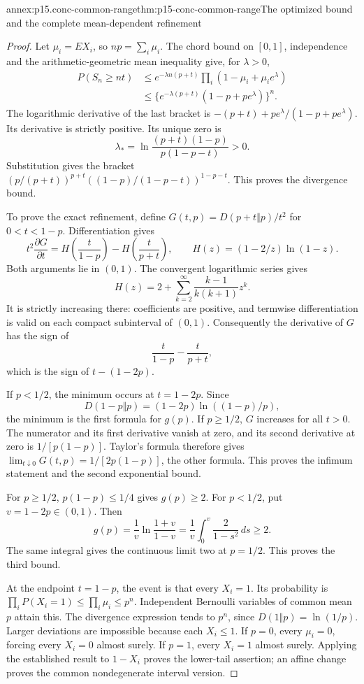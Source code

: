 \begin{annexitem}{annex:p15.conc-common-range}{thm:p15-conc-common-range}{The optimized bound and the complete mean-dependent refinement}
\begin{proof}
Let \(\mu_i=EX_i\), so \(np=\sum_i\mu_i\).
The chord bound on \([0,1]\), independence and the
arithmetic-geometric mean inequality give, for \(\lambda>0\),
\[
 \begin{split}
 P(S_n\geq nt)
 &\leq e^{-\lambda n(p+t)}
                      \prod_i(1-\mu_i+\mu_i e^\lambda)\\
 &\leq \{e^{-\lambda(p+t)}(1-p+pe^\lambda)\}^n.
 \end{split}
\]
The logarithmic derivative of the last bracket is
\(-(p+t)+pe^\lambda/(1-p+pe^\lambda)\).
Its derivative is strictly positive. Its unique zero is
\[
 \lambda_*=
       \ln\frac{(p+t)(1-p)}{p(1-p-t)}>0.
\]
Substitution gives the bracket
\((p/(p+t))^{p+t}((1-p)/(1-p-t))^{1-p-t}\).
This proves the divergence bound.

To prove the exact refinement, define
\(G(t,p)=D(p+t\Vert p)/t^2\) for \(0<t<1-p\).
Differentiation gives
\[
 t^2\frac{\partial G}{\partial t}
      =H\!\left(\frac{t}{1-p}\right)
           -H\!\left(\frac{t}{p+t}\right),
 \qquad H(z)=(1-2/z)\ln(1-z).
\]
Both arguments lie in \((0,1)\). The convergent logarithmic
series gives
\[
 H(z)=2+\sum_{k=2}^{\infty}\frac{k-1}{k(k+1)}z^k.
\]
It is strictly increasing there: coefficients are positive,
and termwise differentiation is valid on each compact
subinterval of \((0,1)\). Consequently the derivative of
\(G\) has the sign of
\[
       \frac{t}{1-p}-\frac{t}{p+t},
\]
which is the sign of \(t-(1-2p)\).

If \(p<1/2\), the minimum occurs at \(t=1-2p\).
Since
\[
 D(1-p\Vert p)=(1-2p)\ln((1-p)/p),
\]
the minimum is the first formula for \(g(p)\).
If \(p\geq1/2\), \(G\) increases for all \(t>0\).
The numerator and its first derivative vanish at zero,
and its second derivative at zero is \(1/[p(1-p)]\).
Taylor's formula therefore gives
\(\lim_{t\downarrow0}G(t,p)=1/[2p(1-p)]\),
the other formula. This proves the infimum statement
and the second exponential bound.

For \(p\geq1/2\), \(p(1-p)\leq1/4\) gives \(g(p)\geq2\).
For \(p<1/2\), put \(v=1-2p\in(0,1)\). Then
\[
 g(p)=\frac1v\ln\frac{1+v}{1-v}
     =\frac1v\int_0^v\frac{2}{1-s^2}\,ds\geq2.
\]
The same integral gives the continuous limit two at \(p=1/2\).
This proves the third bound.

At the endpoint \(t=1-p\), the event is that every \(X_i=1\).
Its probability is \(\prod_iP(X_i=1)\leq\prod_i\mu_i\leq p^n\).
Independent Bernoulli variables of common mean \(p\) attain this.
The divergence expression tends to \(p^n\), since
\(D(1\Vert p)=\ln(1/p)\). Larger deviations are impossible
because each \(X_i\leq1\).
If \(p=0\), every \(\mu_i=0\), forcing every \(X_i=0\) almost
surely. If \(p=1\), every \(X_i=1\) almost surely.
Applying the established result to \(1-X_i\) proves the
lower-tail assertion; an affine change proves the common
nondegenerate interval version.
\end{proof}
\end{annexitem}

